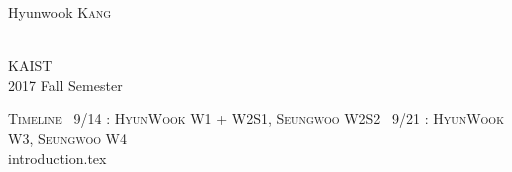\documentclass[twoside]{article}
\begin{document}
\begin{titlepage}
\begin{minipage}{0.4\textwidth}
\begin{flushright}
Hyunwook \textsc{Kang} %
\end{flushright}
\end{minipage}\\[4cm]


\textsc{KAIST}\\[1.5cm] %


2017 Fall Semester


 


\end{titlepage}


\tableofcontents
\newpage
\textsc{ Timeline \newline ~9/14 : HyunWook W1 + W2S1, Seungwoo W2S2 \newline  ~9/21 : HyunWook W3, Seungwoo W4}\\[1.5cm]
\newpage
%
{introduction.tex}
\end{document}
